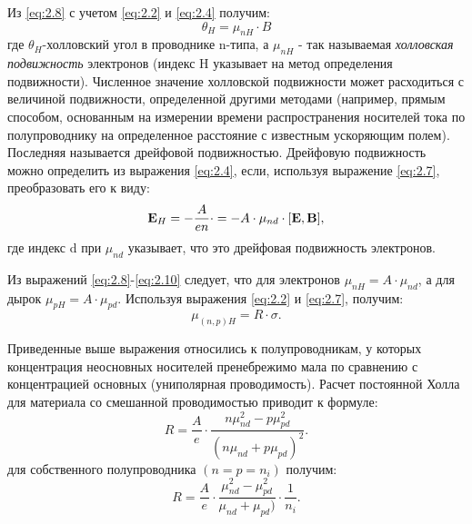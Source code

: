 \documentclass[a4paper,14pt]{extarticle}
\newcommand*\dotvec[1][1,1]{\crossproducttemp#1\relax}
\def\crossproducttemp#1,#2\relax{{\qty[\vec{#1}\times\vec{#2}\,]}}
\renewcommand{\vec}{\mathbf} %
\begin{document}
Из \ref{eq:2.8} с учетом \ref{eq:2.2} и \ref{eq:2.4} получим:
\begin{equation}
\label{eq:2.9}
	\theta_H = \mu_{nH} \cdot B
\end{equation}
где $\theta_H$-холловский угол в проводнике n-типа, а $\mu_{nH}$ - так называемая \textit{холловская подвижность} электронов (индекс H указывает на метод определения подвижности). Численное значение холловской подвижности может расходиться с величиной подвижности, определенной другими методами (например, прямым способом, основанным на измерении времени распространения носителей тока по полупроводнику на определенное расстояние с известным ускоряющим полем). Последняя называется дрейфовой подвижностью. Дрейфовую подвижность можно определить из выражения \ref{eq:2.4}, если, используя выражение \ref{eq:2.7}, преобразовать его к виду:
\begin{equation}
\label{eq:2.10}
	\vec{E}_H = -\frac{A}{en}\cdot\dotvec[j,B]=-A\cdot \mu_{nd} \cdot [\vec{E},\vec{B}],
\end{equation}
где индекс d при $\mu_{nd}$ указывает, что это дрейфовая подвижность электронов.

Из выражений \eqref{eq:2.8}-\eqref{eq:2.10} следует, что для электронов $\mu_{nH}=A\cdot \mu_{nd}$, а для дырок $\mu_{pH}=A\cdot \mu_{pd}$. Используя выражения \eqref{eq:2.2} и \eqref{eq:2.7}, получим:
\begin{equation}
\label{eq:2.11}
	\mu_{(n,p)H}=R\cdot \sigma.
\end{equation}

Приведенные выше выражения относились к полупроводникам, у которых концентрация неосновных носителей пренебрежимо мала по сравнению с концентрацией основных (униполярная проводимость). Расчет постоянной Холла для материала со смешанной проводимостью приводит к формуле:
\begin{equation}
\label{eq:2.12}
	R= \frac{A}{e}\cdot \frac{n\mu^2_{nd}-p\mu^2_{pd}}{(n\mu_{nd}+p\mu_{pd})^2}.
\end{equation}
для собственного полупроводника $(n=p=n_i)$ получим:
\begin{equation}
\label{eq:2.12}
	R= \frac{A}{e}\cdot \frac{\mu^2_{nd}-\mu^2_{pd}}{\mu_{nd}+\mu_{pd})}\cdot \frac{1}{n_i}.
\end{equation}

\end{document}
